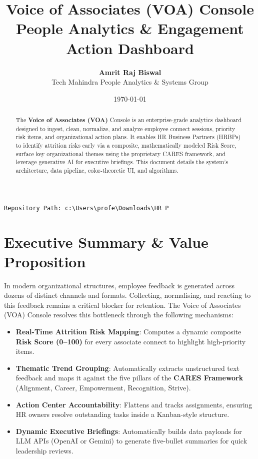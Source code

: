\documentclass[11pt,a4paper]{article}
\title{
    \color{mahindrared}\Huge\textbf{Voice of Associates (VOA) Console} \\[0.4em]
    \large\color{anchorgrey}\textsf{People Analytics \& Engagement Action Dashboard}
}
\author{\textbf{Amrit Raj Biswal} \\ \color{anchorgrey}\textsf{Tech Mahindra People Analytics \& Systems Group}}
\date{\today}
\begin{document}
\maketitle

\begin{abstract}
The \textbf{Voice of Associates (VOA)} Console is an enterprise-grade analytics dashboard designed to ingest, clean, normalize, and analyze employee connect sessions, priority risk items, and organizational action plans. It enables HR Business Partners (HRBPs) to identify attrition risks early via a composite, mathematically modeled Risk Score, surface key organizational themes using the proprietary CARES framework, and leverage generative AI for executive briefings. This document details the system's architecture, data pipeline, color-theoretic UI, and algorithms.
\end{abstract}

\vfill
\noindent\makebox[\linewidth]{\rule{\textwidth}{0.8pt}}
\begin{center}
    \small\color{steelgrey}\texttt{Repository Path: c:\textbackslash Users\textbackslash profe\textbackslash Downloads\textbackslash HR P}
\end{center}
\newpage

\tableofcontents
\newpage

\section{Executive Summary \& Value Proposition}
In modern organizational structures, employee feedback is generated across dozens of distinct channels and formats. Collecting, normalising, and reacting to this feedback remains a critical blocker for retention. The Voice of Associates (VOA) Console resolves this bottleneck through the following mechanisms:

\begin{itemize}
    \item \textbf{Real-Time Attrition Risk Mapping}: Computes a dynamic composite \textbf{Risk Score (0--100)} for every associate connect to highlight high-priority items.
    \item \textbf{Thematic Trend Grouping}: Automatically extracts unstructured text feedback and maps it against the five pillars of the \textbf{CARES Framework} (Alignment, Career, Empowerment, Recognition, Strive).
    \item \textbf{Action Center Accountability}: Flattens and tracks assignments, ensuring HR owners resolve outstanding tasks inside a Kanban-style structure.
    \item \textbf{Dynamic Executive Briefings}: Automatically builds data payloads for LLM APIs (OpenAI or Gemini) to generate five-bullet summaries for quick leadership reviews.
\end{itemize}
\end{document}
